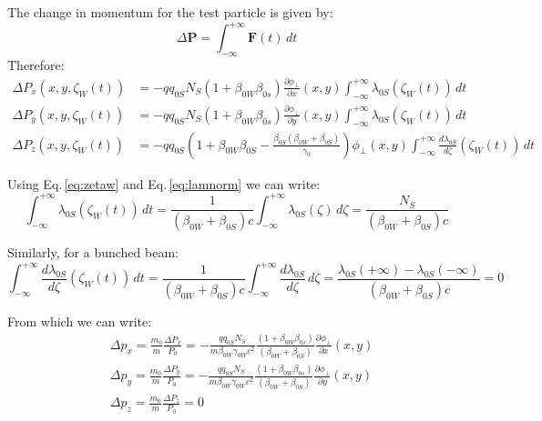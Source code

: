 The change in momentum for the test particle is given by:
\begin{equation}
\Delta \textbf{P} = \int_{-\infty}^{+\infty} \textbf{F}(t) \,dt
\end{equation}
Therefore:
\begin{align}
\Delta P_x(x, y, \zeta_W(t)) &=  -qq_{0S} N_S (1+\beta_{0W}  \beta_{0s})
\frac{\partial \phi_\perp}{\partial x}(x, y ) \int_{-\infty}^{+\infty}\lambda_{0S}(\zeta_W(t)) \,dt\\
\Delta P_y(x, y, \zeta_W(t)) &=  -qq_{0S} N_S (1+\beta_{0W}  \beta_{0s})
 \frac{\partial \phi_\perp}{\partial y}(x, y ) \int_{-\infty}^{+\infty}\lambda_{0S}(\zeta_W(t)) \,dt\\
\Delta P_z(x, y, \zeta_W(t)) &=  -qq_{0S}\left(1+\beta_{0W}  \beta_{0S} -\frac{\beta_{0S}(\beta_{0W}+\beta_{0S})}{\gamma_0}\right) \phi_\perp(x, y) \int_{-\infty}^{+\infty}\frac{d \lambda_{0S}}{d \zeta}(\zeta_W(t)) \, dt
\end{align}

Using Eq.\,\eqref{eq:zetaw} and Eq.\,\eqref{eq:lamnorm} we can write:
\begin{equation}
\int_{-\infty}^{+\infty}\lambda_{0S}(\zeta_W(t)) \,dt 
=\frac{1}{(\beta_{0W}+\beta_{0S})c}\int_{-\infty}^{+\infty}\lambda_{0S}(\zeta) \,d\zeta = \frac{N_S}{(\beta_{0W}+\beta_{0S})c}
\end{equation}

Similarly, for a bunched beam:
\begin{equation}
\int_{-\infty}^{+\infty}
\frac{d \lambda_{0S}}{d \zeta}(\zeta_W(t)) \,dt 
=\frac{1}{(\beta_{0W}+\beta_{0S})c}\int_{-\infty}^{+\infty}\frac{d \lambda_{0S}}{d \zeta} \,d\zeta = \frac{ \lambda_{0S}(+\infty)-\lambda_{0S}(-\infty)}{(\beta_{0W}+\beta_{0S})c} = 0
\end{equation}

From which we can write:
\begin{align}
&\boxed{
\Delta p_x = \frac{m_0}{m}\frac{\Delta P_x} {P_0}= -\frac{qq_{0S} N_S 
}{m\beta_{0W}\gamma_{0W}c^2}
\frac{(1+\beta_{0W}  \beta_{0s})}{(\beta_{0W}+\beta_{0S})}
\frac{\partial \phi_\perp}{\partial x}(x, y )}\\
&\boxed{
\Delta p_y = \frac{m_0}{m}\frac{\Delta P_y} {P_0}= -\frac{qq_{0S} N_S 
}{m\beta_{0W}\gamma_{0W}c^2}
\frac{(1+\beta_{0W}  \beta_{0s})}{(\beta_{0W}+\beta_{0S})}
\frac{\partial \phi_\perp}{\partial y}(x, y )}\\
&\boxed{
\Delta p_z = \frac{m_0}{m}\frac{\Delta P_z} {P_0}=0}
\end{align}

